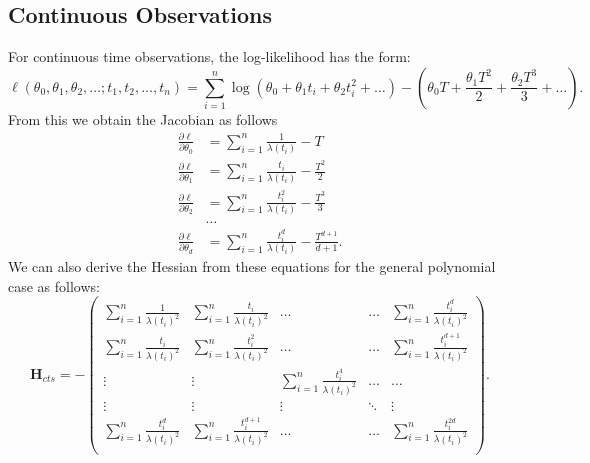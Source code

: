 \documentclass[11pt,a4,twosided,singlespacing,titlepagenumber=on,numbers=endperiod]{scrreprt}
\numberwithin{equation}{chapter} %
\theoremstyle{remark}
\begin{document}
\subsection{Continuous Observations}
For continuous time observations, the log-likelihood has the form:
\begin{equation}\label{eq:poly_loglikeli}
	\ell(\theta_0, \theta_1, \theta_2, \dots; t_1, t_2, \dots, t_n) = \sum_{i=1}^n \log(\theta_0 + \theta_1t_i + \theta_2t_i^2 + \dots) - (\theta_0T + \frac{\theta_1T^2}{2} + \frac{\theta_2T^3}{3} + \dots).
\end{equation}
From this we obtain the Jacobian as follows
\begin{equation*}
    \begin{aligned}
        \frac{\partial \ell}{\partial \theta_0} &= \sum_{i=1}^n \frac{1}{\lambda(t_i)} - T \\
        \frac{\partial \ell}{\partial \theta_1} &= \sum_{i=1}^n \frac{t_i}{\lambda(t_i)} - \frac{T^2}{2} \\
        \frac{\partial \ell}{\partial \theta_2} &= \sum_{i=1}^n \frac{t_i^2}{\lambda(t_i)} - \frac{T^3}{3} \\
        & \dots  \\
        \frac{\partial \ell}{\partial \theta_d} &= \sum_{i=1}^n \frac{t_i^d}{\lambda(t_i)} - \frac{T^{d + 1}}{d + 1}.
    \end{aligned}
\end{equation*}
We can also derive the Hessian from these equations for the general polynomial case as follows:
\begin{equation*}
	\mathbf{H}_{cts} = -\begin{pmatrix}
		\sum_{i=1}^n \frac{1}{\lambda(t_i)^2} & \sum_{i=1}^n \frac{t_i}{\lambda(t_i)^2} & \dots & \dots & \sum_{i=1}^n \frac{t_i^d}{\lambda(t_i)^2}\\
		\sum_{i=1}^n \frac{t_i}{\lambda(t_i)^2} & \sum_{i=1}^n \frac{t_i^2}{\lambda(t_i)^2} & \dots & \dots & \sum_{i=1}^n \frac{t_i^{d+1}}{\lambda(t_i)^2}\\
		\vdots & \vdots & \sum_{i=1}^n \frac{t_i^4}{\lambda(t_i)^2} & \dots & \dots \\
		\vdots & \vdots & \vdots & \ddots & \vdots\\
		\sum_{i=1}^n \frac{t_i^d}{\lambda(t_i)^2} & \sum_{i=1}^n \frac{t_i^{d+1}}{\lambda(t_i)^2} & \dots & \dots & \sum_{i=1}^n \frac{t_i^{2d}}{\lambda(t_i)^2}\\
	\end{pmatrix}.
\end{equation*}
\end{document}
